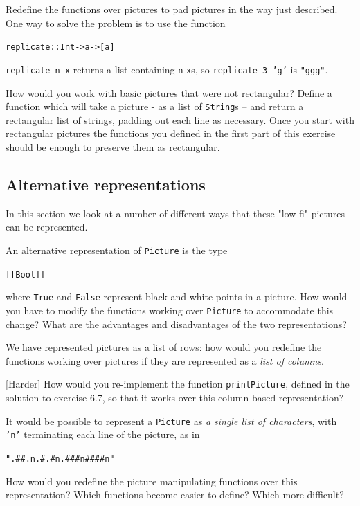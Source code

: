 \begin{exercises}

\item
Redefine the functions over pictures to pad pictures in the way just described. One way to solve the problem is to use the function
\begin{alltt}
replicate :: Int -> a -> [a]
\end{alltt}
\texttt{replicate n x} returns a list containing \texttt{n} \texttt{x}s, so \texttt{replicate 3 'g'} is \texttt{"ggg"}.

\item
How would you work with basic pictures that were not rectangular? Define a function which will take a picture - as a list of \texttt{String}s -- and return a rectangular list of strings, padding out each line as necessary. Once you start with rectangular pictures the functions you defined in the first part of this exercise should be enough to preserve them as rectangular.
\end{exercises}

\subsection*{Alternative representations}

In this section we look at a number of different ways that these "low fi" pictures can be represented.


\begin{exercises}


\item
An alternative representation of \texttt{Picture} is the type
\begin{alltt}
[[Bool]]
\end{alltt}
where \texttt{True}
and \texttt{False} represent black and white points in a picture. How
would you have to modify the functions working over \texttt{Picture} to
accommodate this change? What are the advantages and disadvantages of
the two representations?


\item
We have represented pictures as a list of rows: how would you redefine the functions working over pictures if they are represented as a \emph{list of columns}. 

\item {[Harder]}
How would you re-implement the function \texttt{printPicture}, defined in the solution to exercise 6.7, so that it works over this column-based representation?

\item
It would be possible to represent a \texttt{Picture} as \emph{a single list of characters}, with \texttt{'\bs{}n'} terminating each line of the picture, as in
\begin{alltt}
".\#\#.\bs{}n.\#.\#\bs{}n.\#\#\#\bs{}n\#\#\#\#\bs{}n"
\end{alltt}
How would you redefine the picture manipulating functions over this representation? Which functions become easier to define? Which more difficult?

\end{exercises}

